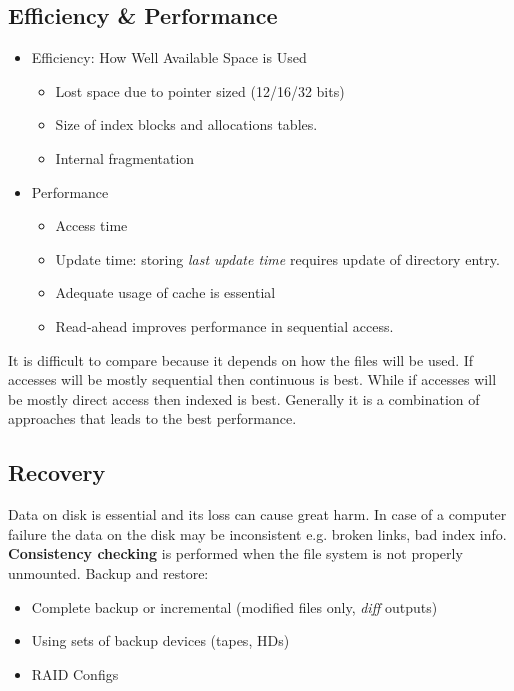 \documentclass{article}%
\begin{document}
\subsection{Efficiency \& Performance}
\label{sec:org0f0a1a9}
\begin{itemize}
\item Efficiency: How Well Available Space is Used
\begin{itemize}
\item Lost space due to pointer sized (12/16/32 bits)
\item Size of index blocks and allocations tables.
\item Internal fragmentation
\end{itemize}

\item Performance
\begin{itemize}
\item Access time
\item Update time: storing \emph{last update time} requires update of directory entry.
\item Adequate usage of cache is essential
\item Read-ahead improves performance in sequential access.
\end{itemize}
\end{itemize}
It is difficult to compare because it depends on how the files will be used.
If accesses will be mostly sequential then continuous is best.
While if accesses will be mostly direct access then indexed is best.
Generally it is a combination of approaches that leads to the best performance.

\subsection{Recovery}
\label{sec:org59168cc}
Data on disk is essential and its loss can cause great harm.
In case of a computer failure the data on the disk may be inconsistent e.g. broken links, bad index info.
\textbf{Consistency checking} is performed when the file system is not properly unmounted.
Backup and restore:
\begin{itemize}
\item Complete backup or incremental (modified files only, \emph{diff} outputs)
\item Using sets of backup devices (tapes, HDs)
\item RAID Configs
\end{itemize}

\maketitle
\end{document}
